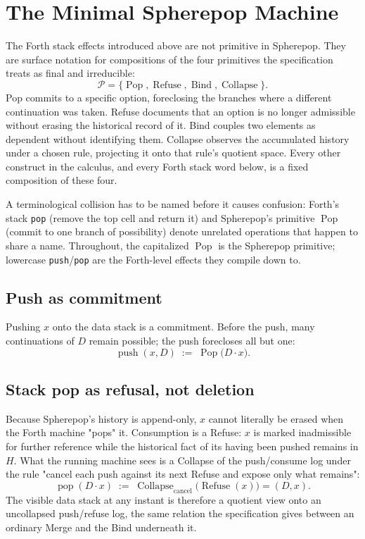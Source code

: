 \documentclass[12pt]{article}
\begin{document}
\section{The Minimal Spherepop Machine}

The Forth stack effects introduced above are not primitive in Spherepop. They are surface notation for compositions of the four primitives the specification treats as final and irreducible:
\[
\mathcal{P} = \{\operatorname{Pop}, \operatorname{Refuse}, \operatorname{Bind}, \operatorname{Collapse}\}.
\]
Pop commits to a specific option, foreclosing the branches where a different continuation was taken. Refuse documents that an option is no longer admissible without erasing the historical record of it. Bind couples two elements as dependent without identifying them. Collapse observes the accumulated history under a chosen rule, projecting it onto that rule's quotient space. Every other construct in the calculus, and every Forth stack word below, is a fixed composition of these four.

A terminological collision has to be named before it causes confusion: Forth's stack \texttt{pop} (remove the top cell and return it) and Spherepop's primitive \(\operatorname{Pop}\) (commit to one branch of possibility) denote unrelated operations that happen to share a name. Throughout, the capitalized \(\operatorname{Pop}\) is the Spherepop primitive; lowercase \texttt{push}/\texttt{pop} are the Forth-level effects they compile down to.

\subsection*{Push as commitment}
Pushing \(x\) onto the data stack is a commitment. Before the push, many continuations of \(D\) remain possible; the push forecloses all but one:
\[
\operatorname{push}(x,D) \;:=\; \operatorname{Pop}\bigl(D\cdot x\bigr).
\]

\subsection*{Stack pop as refusal, not deletion}
Because Spherepop's history is append-only, \(x\) cannot literally be erased when the Forth machine "pops" it. Consumption is a Refuse: \(x\) is marked inadmissible for further reference while the historical fact of its having been pushed remains in \(H\). What the running machine sees is a Collapse of the push/consume log under the rule "cancel each push against its next Refuse and expose only what remains":
\[
\operatorname{pop}(D\cdot x) \;:=\; \operatorname{Collapse}_{\mathrm{cancel}}\bigl(\operatorname{Refuse}(x)\bigr) = (D,x).
\]
The visible data stack at any instant is therefore a quotient view onto an uncollapsed push/refuse log, the same relation the specification gives between an ordinary Merge and the Bind underneath it.
\end{document}
